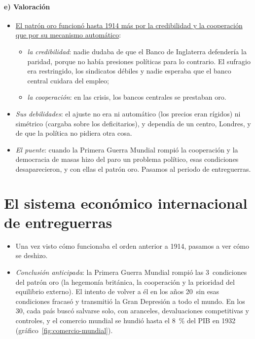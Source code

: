 \documentclass[11pt]{article}
\begin{document}
\paragraph{e) Valoración}

\begin{itemize}
\item \uline{El patrón oro funcionó hasta 1914 más por la credibilidad y la cooperación que por su mecanismo automático}\nocite{Eichengreen2019Globalizing}:
  \begin{itemize}
  \item \emph{la credibilidad}: nadie dudaba de que el Banco de Inglaterra defendería la paridad, porque no había presiones políticas para lo contrario. El sufragio era restringido, los sindicatos débiles y nadie esperaba que el banco central cuidara del empleo;
  \item \emph{la cooperación}: en las crisis, los bancos centrales se prestaban oro.
  \end{itemize}
\item \emph{Sus debilidades}: el ajuste no era ni automático (los precios eran rígidos) ni simétrico (cargaba sobre los deficitarios), y dependía de un centro, Londres, y de que la política no pidiera otra cosa.
\item \emph{El puente}: cuando la Primera Guerra Mundial rompió la cooperación y la democracia de masas hizo del paro un problema político, esas condiciones desaparecieron, y con ellas el patrón oro. Pasamos al periodo de entreguerras.
\end{itemize}

\section{El sistema económico internacional de entreguerras}\label{sec:entreguerras}

\begin{itemize}
\item Una vez visto cómo funcionaba el orden anterior a 1914, pasamos a ver cómo se deshizo.
\item \emph{Conclusión anticipada}: la Primera Guerra Mundial rompió las 3~condiciones del patrón oro (la hegemonía británica, la cooperación y la prioridad del equilibrio externo). El intento de volver a él en los años 20~sin esas condiciones fracasó y transmitió la Gran Depresión a todo el mundo. En los 30, cada país buscó salvarse solo, con aranceles, devaluaciones competitivas y controles, y el comercio mundial se hundió hasta el 8~\% del PIB en 1932 (gráfico~\ref{fig:comercio-mundial}).
\end{itemize}
\end{document}
